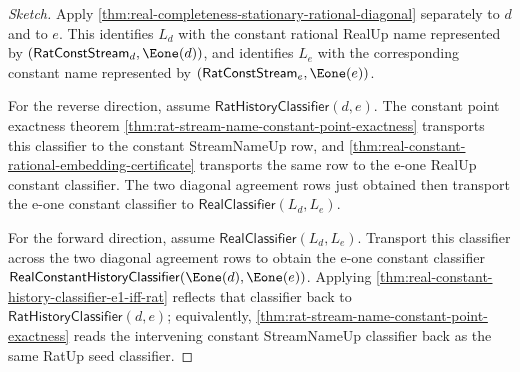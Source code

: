 \begin{proof}[Sketch]
Apply
\autoref{thm:real-completeness-stationary-rational-diagonal} separately to
$d$ and to $e$. This identifies $L_d$ with the constant rational RealUp name
represented by $(\mathsf{RatConstStream}_d,\Eone(d))$, and identifies $L_e$
with the corresponding constant name represented by
$(\mathsf{RatConstStream}_e,\Eone(e))$.

For the reverse direction, assume
$\mathsf{RatHistoryClassifier}(d,e)$. The constant point exactness theorem
\autoref{thm:rat-stream-name-constant-point-exactness} transports this
classifier to the constant StreamNameUp row, and
\autoref{thm:real-constant-rational-embedding-certificate} transports the
same row to the e-one RealUp constant classifier. The two diagonal agreement
rows just obtained then transport the e-one constant classifier to
$\mathsf{RealClassifier}(L_d,L_e)$.

For the forward direction, assume $\mathsf{RealClassifier}(L_d,L_e)$. Transport
this classifier across the two diagonal agreement rows to obtain the e-one
constant classifier
$\mathsf{RealConstantHistoryClassifier}(\Eone(d),\Eone(e))$. Applying
\autoref{thm:real-constant-history-classifier-e1-iff-rat} reflects that
classifier back to $\mathsf{RatHistoryClassifier}(d,e)$; equivalently,
\autoref{thm:rat-stream-name-constant-point-exactness} reads the intervening
constant StreamNameUp classifier back as the same RatUp seed classifier.
\end{proof}




